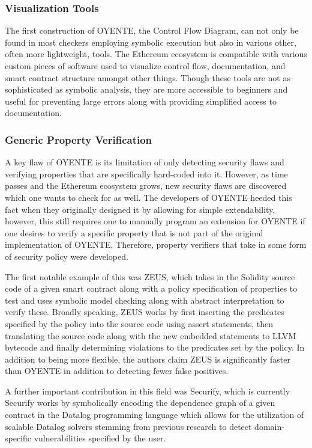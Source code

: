 \documentclass[letterpaper,twocolumn,10pt]{article}
\begin{document}
\subsubsection{Visualization Tools}
The first construction of OYENTE, the Control Flow Diagram, can not only be found in most checkers employing symbolic execution but also in various other, often more lightweight, tools. The Ethereum ecosystem is compatible with various custom pieces of software used to visualize control flow, documentation, and smart contract structure amongst other things. Though these tools are not as sophisticated as symbolic analysis, they are more accessible to beginners and useful for preventing large errors along with providing simplified access to documentation. 

\subsubsection{Generic Property Verification}
A key flaw of OYENTE is its limitation of only detecting security flaws and verifying properties that are specifically hard-coded into it. However, as time passes and the Ethereum ecosystem grows, new security flaws are discovered which one wants to check for as well. The developers of OYENTE heeded this fact when they originally designed it by allowing for simple extendability, however, this still requires one to manually program an extension for OYENTE if one desires to verify a specific property that is not part of the original implementation of OYENTE. Therefore, property verifiers that take in some form of security policy were developed. 


The first notable example of this was ZEUS, which takes in the Solidity source code of a given smart contract along with a policy specification of properties to test and uses symbolic model checking along with abstract interpretation to verify these. Broadly speaking, ZEUS works by first inserting the predicates specified by the policy into the source code using assert statements, then translating the source code along with the new embedded statements to LLVM bytecode and finally determining violations to the predicates set by the policy. In addition to being more flexible, the authors claim ZEUS is significantly faster than OYENTE in addition to detecting fewer false positives. 


A further important contribution in this field was Securify, which is currently  Securify works by symbolically encoding the dependence graph of a given contract in the Datalog programming language which allows for the utilization of scalable Datalog solvers stemming from previous research to detect domain-specific vulnerabilities specified by the user.
\end{document}
